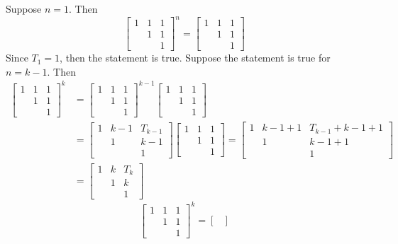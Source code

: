 \documentclass[openany]{book}
\begin{document}
\begin{description}
Suppose $n = 1$. Then
$$\begin{bmatrix}
1 & 1 & 1 \\
& 1 & 1 \\
& & 1
\end{bmatrix}^n = \begin{bmatrix}
1 & 1 & 1 \\
& 1 & 1 \\
& & 1
\end{bmatrix}$$
Since $T_1 = 1$, then the statement is true. Suppose the statement is true for $n = k - 1$. Then
\begin{align*}
\begin{bmatrix}
1 & 1 & 1 \\
& 1 & 1 \\
& & 1
\end{bmatrix}^k & = \begin{bmatrix}
1 & 1 & 1 \\
& 1 & 1 \\
& & 1
\end{bmatrix}^{k-1}\begin{bmatrix}
1 & 1 & 1 \\
& 1 & 1 \\
& & 1
\end{bmatrix}		\\
&= \begin{bmatrix}
1 & k-1 & T_{k-1} \\
& 1 & k-1 \\
& & 1
\end{bmatrix}\begin{bmatrix}
1 & 1 & 1 \\
& 1 & 1 \\
& & 1
\end{bmatrix} = \begin{bmatrix}
1 & k-1 + 1 & T_{k-1} + k-1 + 1 \\
& 1 & k -1 + 1 \\
& & 1 
\end{bmatrix}\\
& = \begin{bmatrix}
1 & k & T_k \\
& 1 & k \\
& & 1
\end{bmatrix}
\end{align*}
$$\begin{bmatrix}
1 & 1 & 1 \\
& 1 & 1 \\
& & 1
\end{bmatrix}^k = \begin{bmatrix}

\end{bmatrix}$$
\end{description}
\end{document}
